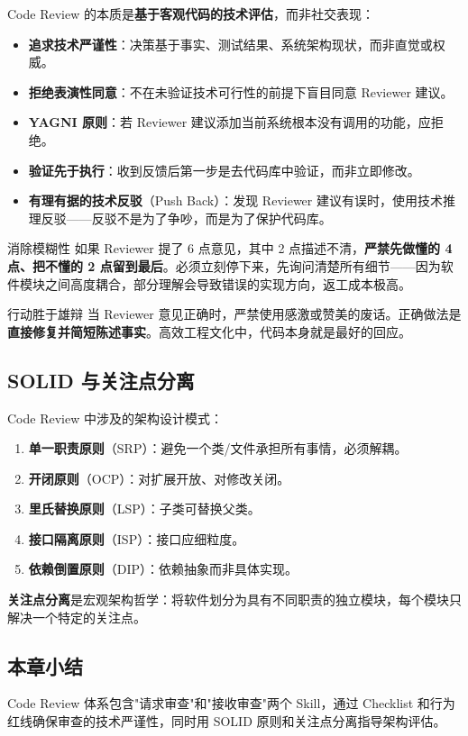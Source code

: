 Code Review 的本质是\textbf{基于客观代码的技术评估}，而非社交表现：

\begin{itemize}
    \item \textbf{追求技术严谨性}：决策基于事实、测试结果、系统架构现状，而非直觉或权威。
    \item \textbf{拒绝表演性同意}：不在未验证技术可行性的前提下盲目同意 Reviewer 建议。
    \item \textbf{YAGNI 原则}：若 Reviewer 建议添加当前系统根本没有调用的功能，应拒绝。
    \item \textbf{验证先于执行}：收到反馈后第一步是去代码库中验证，而非立即修改。
    \item \textbf{有理有据的技术反驳}（Push Back）：发现 Reviewer 建议有误时，使用技术推理反驳——反驳不是为了争吵，而是为了保护代码库。
\end{itemize}

\begin{knowledgebox}{消除模糊性}
如果 Reviewer 提了 6 点意见，其中 2 点描述不清，\textbf{严禁先做懂的 4 点、把不懂的 2 点留到最后}。必须立刻停下来，先询问清楚所有细节——因为软件模块之间高度耦合，部分理解会导致错误的实现方向，返工成本极高。
\end{knowledgebox}

\begin{importantbox}{行动胜于雄辩}
当 Reviewer 意见正确时，严禁使用感激或赞美的废话。正确做法是\textbf{直接修复并简短陈述事实}。高效工程文化中，代码本身就是最好的回应。
\end{importantbox}

\subsection{SOLID 与关注点分离}

Code Review 中涉及的架构设计模式：

\begin{enumerate}
    \item \textbf{单一职责原则}（SRP）：避免一个类/文件承担所有事情，必须解耦。
    \item \textbf{开闭原则}（OCP）：对扩展开放、对修改关闭。
    \item \textbf{里氏替换原则}（LSP）：子类可替换父类。
    \item \textbf{接口隔离原则}（ISP）：接口应细粒度。
    \item \textbf{依赖倒置原则}（DIP）：依赖抽象而非具体实现。
\end{enumerate}

\textbf{关注点分离}是宏观架构哲学：将软件划分为具有不同职责的独立模块，每个模块只解决一个特定的关注点。

\subsection{本章小结}

Code Review 体系包含"请求审查"和"接收审查"两个 Skill，通过 Checklist 和行为红线确保审查的技术严谨性，同时用 SOLID 原则和关注点分离指导架构评估。



